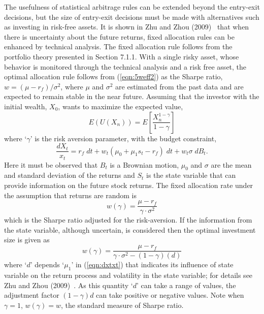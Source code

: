 The usefulness of statistical arbitrage rules can be extended beyond the entry-exit decisions, but the size of entry-exit decisions must be made with alternatives such as investing in risk-free assets. It is shown in Zhu and Zhou (2009)~\cite{zhuzhou09} that when there is uncertainty about the future returns, fixed allocation rules can be enhanced by technical analysis. The fixed allocation rule follows from the portfolio theory presented in Section 7.1.1. With a single risky asset, whose behavior is monitored through the technical analysis and a risk free asset, the optimal allocation rule follows from (\ref{eqn:5weff2}) as the Sharpe ratio, $w=(\mu-r_f)/\sigma^2$, where $\mu$ and $\sigma^2$ are estimated from the past data and are expected to remain stable in the near future. Assuming that the investor with the initial wealth, $X_0$, wants to maximize the expected value,
	\begin{equation}\label{eqn:euxn}
	E(U(X_n))= E \left[ \dfrac{X_n^{1-\gamma}}{1-\gamma}\right]
	\end{equation}
where `$\gamma$' is the risk aversion parameter, with the budget constraint,
	\begin{equation}\label{eqn:dxtxt}
	\dfrac{dX_t}{x_t}= r_f \; dt + w_t (\mu_0 + \mu_1 s_t - r_f) \; dt + w_t \sigma \; dB_t.
	\end{equation}
Here it must be observed that $B_t$ is a Brownian motion, $\mu_0$ and $\sigma$ are the mean and standard deviation of the returns and $S_t$ is the state variable that can provide information on the future stock returns. The fixed allocation rate under the assumption that returns are random is
	\begin{equation}\label{eqn:wgamma}
	w(\gamma)= \dfrac{\mu - r_f}{\gamma \cdot \sigma^2}
	\end{equation}
which is the Sharpe ratio adjusted for the risk-aversion. If the information from the state variable, although uncertain, is considered then the optimal investment size is given as
	\begin{equation}\label{eqn:wgamma2}
	w(\gamma)= \dfrac{\mu - r_f}{\gamma \cdot \sigma^2 - (1-\gamma)(d)}
	\end{equation}
where `$d$' depends `$\mu_1$' in (\ref{eqn:dxtxt}) that indicates its influence of state variable on the return process and volatility in the state variable; for details see Zhu and Zhou (2009)~\cite{zhuzhou09}. As this quantity `$d$' can take a range of values, the adjustment factor $(1-\gamma)d$ can take positive or negative values. Note when $\gamma=1$, $w(\gamma)=w$, the standard measure of Sharpe ratio. 


